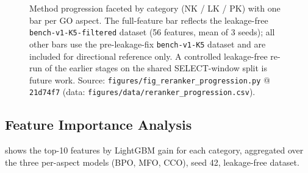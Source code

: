 \begin{figure}[htbp]
  \centering
  
  \caption[Re-ranker progression across methods]{%
    Method progression faceted by category (NK / LK / PK) with one bar per GO
    aspect. The full-feature bar reflects the leakage-free \texttt{bench-v1-K5-filtered}
    dataset (56 features, mean of 3 seeds); all other bars use the
    pre-leakage-fix \texttt{bench-v1-K5} dataset and are included for
    directional reference only. A controlled leakage-free re-run of the earlier
    stages on the shared SELECT-window split is future work.
    Source: \texttt{figures/fig\_reranker\_progression.py} @ \texttt{21d74f7}
    (data: \texttt{figures/data/reranker\_progression.csv}).%
  }
  \label{fig:reranker-progression}
\end{figure}

\subsection{Feature Importance Analysis}

 shows the top-10 features by LightGBM gain
for each category, aggregated over the three per-aspect models (BPO, MFO, CCO),
seed 42, leakage-free dataset.

